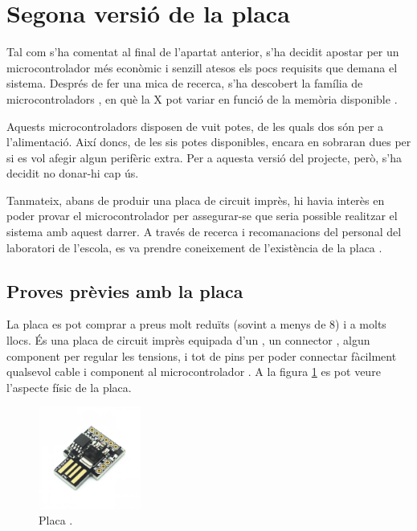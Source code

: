 \section{Segona versió de la placa}

Tal com s'ha comentat al final de l'apartat anterior, s'ha decidit apostar
per un microcontrolador més econòmic i senzill atesos els pocs requisits que
demana el sistema. Després de fer una mica de recerca, s'ha descobert la
família de microcontroladors , en què la X pot variar en funció de
la memòria  disponible \cite{AtTiny85}.

Aquests microcontroladors disposen de vuit potes, de les quals dos són per a
l'alimentació. Així doncs, de les sis potes disponibles, encara en sobraran dues
per si es vol afegir algun perifèric extra. Per a aquesta versió del projecte,
però, s'ha decidit no donar-hi cap ús.

Tanmateix, abans de produir una placa de circuit imprès, hi havia interès en
poder provar el microcontrolador per assegurar-se que seria possible
realitzar el sistema amb aquest darrer. A través de recerca i recomanacions del
personal del laboratori de l'escola, es va prendre coneixement de l'existència de
la placa .

\subsection{Proves prèvies amb la placa }
\label{subsec:hw_digispark}

La placa  es pot comprar a preus molt reduïts (sovint a menys de 
\SI[round-mode=places,round-precision=0]{8}{\EUR}) i a molts llocs.
És una placa de circuit imprès equipada d'un , un connector
, algun component per regular les tensions, i tot de pins per
poder connectar fàcilment qualsevol cable i component al microcontrolador
\cite{Digispark}. A la figura \ref{fig:digispark} es pot veure l'aspecte físic
de la placa.

\begin{figure}[ht]
    \centering
    \includegraphics[width=0.3\textwidth]{images/modules/digisparkimg.png}
    \caption{Placa  \cite{Digispark}.}
    \label{fig:digispark}
\end{figure}

